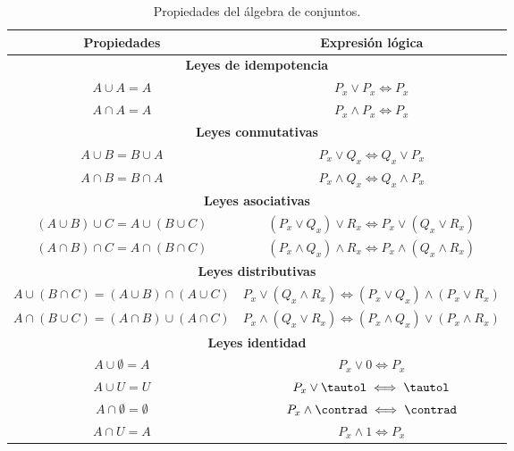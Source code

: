 \begin{table}
  \centering
  \caption{Propiedades del álgebra de conjuntos.}
  \label{tbl:algebra_conjuntos}
  \renewcommand{\arraystretch}{1.5}
  \begin{tabular}{|c|c|}
    \hline
    \textbf{Propiedades} & \textbf{Expresión lógica} \\
    \hline
    \multicolumn{2}{|c|}{\textbf{Leyes de idempotencia}} \\
    \hline
    $A \cup A = A$ & $P_x \lor P_x \iff P_x$ \\
    $A \cap A = A$ & $P_x \land P_x \iff P_x$ \\

    \hline

    \multicolumn{2}{|c|}{\textbf{Leyes conmutativas}} \\
    \hline
    $A \cup B = B \cup A$ & $P_x \lor Q_x \iff Q_x \lor P_x$ \\
    $A \cap B = B \cap A$ & $P_x \land Q_x \iff Q_x \land P_x$ \\

    \hline

    \multicolumn{2}{|c|}{\textbf{Leyes asociativas}} \\
    \hline
    $(A \cup B) \cup C = A \cup (B \cup C)$ & $(P_x \lor Q_x) \lor R_x \iff
      P_x \lor (Q_x \lor R_x)$ \\
    $(A \cap B) \cap C = A \cap (B \cap C)$ & $(P_x \land Q_x) \land R_x
      \iff P_x \land (Q_x \land R_x)$ \\

    \hline

    \multicolumn{2}{|c|}{\textbf{Leyes distributivas}} \\
    \hline
    $A \cup (B \cap C) = (A \cup B) \cap (A \cup C)$ & $P_x \lor (Q_x \land
      R_x) \iff (P_x \lor Q_x) \land (P_x \lor R_x)$ \\
    $A \cap (B \cup C) = (A \cap B) \cup (A \cap C)$ & $P_x \land (Q_x \lor
      R_x) \iff (P_x \land Q_x) \lor (P_x \land R_x)$ \\

    \hline

    \multicolumn{2}{|c|}{\textbf{Leyes identidad}} \\
    \hline
    $A \cup \emptyset = A$ & $P_x \lor 0 \iff P_x$ \\
    $A \cup U = U$ & $P_x \lor \tautol \iff \tautol$ \\
    $A \cap \emptyset = \emptyset$ & $P_x \land \contrad \iff \contrad$ \\
    $A \cap U = A$ & $P_x \land 1 \iff P_x$ \\


\end{tabular}
\end{table}
